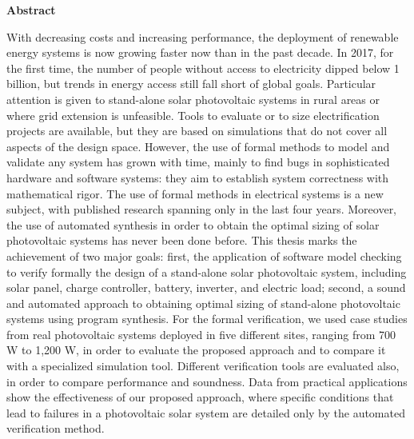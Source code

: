 \thispagestyle{plain}
\begin{center}
%    
%    
%    
    \vspace{0.9cm}
    \textbf{Abstract}
\end{center}
With decreasing costs and increasing performance, the deployment of renewable energy systems is now growing faster now than in the past decade. In 2017, for the first time, the number of people without access to electricity dipped below 1 billion, but trends in energy access still fall short of global goals. Particular attention is given to stand-alone solar photovoltaic systems in rural areas or where grid extension is unfeasible. Tools to evaluate or to size electrification projects are available, but they are based on simulations that do not cover all aspects of the design space. However, the use of formal methods to model and validate any system has grown with time, mainly to find bugs in sophisticated hardware and software systems: they aim to establish system correctness with mathematical rigor. The use of formal methods in electrical systems is a new subject, with published research spanning only in the last four years.
Moreover, the use of automated synthesis in order to obtain the optimal sizing of solar photovoltaic systems has never been done before. This thesis marks the achievement of two major goals: first, the application of software model checking to verify formally the design of a stand-alone solar photovoltaic system, including solar panel, charge controller, battery, inverter, and electric load; second, a sound and automated approach to obtaining optimal sizing of stand-alone photovoltaic systems using program synthesis. For the  formal verification, we used case studies from real photovoltaic systems deployed in five different sites, ranging from 700 W to 1,200 W, in order to evaluate the proposed approach and to compare it with a specialized simulation tool. Different verification tools are evaluated also, in order to compare performance and soundness. Data from practical applications show the effectiveness of our proposed approach, where specific conditions that lead to failures in a photovoltaic solar system are detailed only by the automated verification method.
